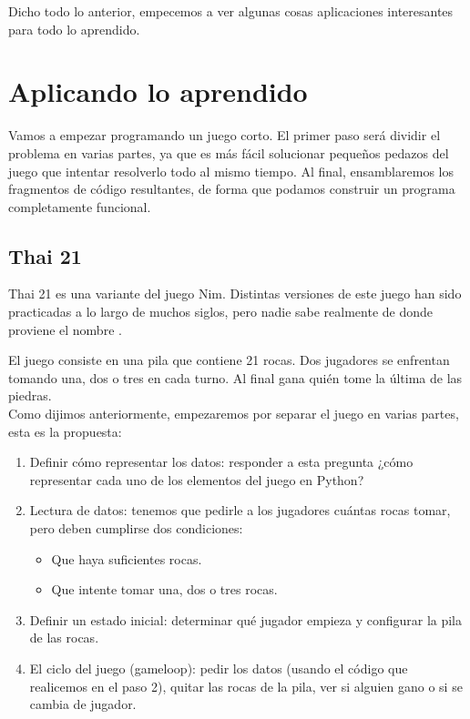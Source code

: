 Dicho todo lo anterior, empecemos a ver algunas cosas aplicaciones interesantes para todo lo aprendido.

\newpage

\section{Aplicando lo aprendido}

Vamos a empezar programando un juego corto. El primer paso será dividir el problema en varias partes, ya que es más fácil solucionar pequeños pedazos del juego que intentar resolverlo todo al mismo tiempo. Al final, ensamblaremos los fragmentos de código resultantes, de forma que podamos construir un programa completamente funcional.

\subsection{Thai 21}

Thai 21 es una variante del juego Nim. Distintas versiones de este juego han sido practicadas a lo largo de muchos siglos, pero nadie sabe realmente de donde proviene el nombre \cite{evansIntro}.

El juego consiste en una pila que contiene 21 rocas. Dos jugadores se enfrentan tomando una, dos o tres en cada turno. Al final gana quién tome la última de las piedras. \\

Como dijimos anteriormente, empezaremos por separar el juego en varias partes, esta es la propuesta:

\begin{enumerate}
	\item Definir cómo representar los datos: responder a esta pregunta ¿cómo representar cada uno de los elementos del juego en Python?
	\item Lectura de datos: tenemos que pedirle a los jugadores cuántas rocas tomar, pero deben cumplirse dos condiciones:
	\begin{itemize}
		\item Que haya suficientes rocas.
		\item Que intente tomar una, dos o tres rocas.
	\end{itemize}
	
	\item Definir un estado inicial: determinar qué jugador empieza y configurar la pila de las rocas.
	
	\item El ciclo del juego (gameloop): pedir los datos (usando el código que realicemos en el paso 2), quitar las rocas de la pila, ver si alguien gano o si se cambia de jugador.
\end{enumerate}

